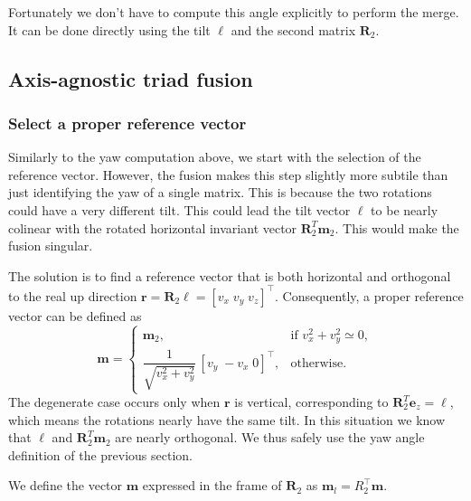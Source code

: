 \documentclass{IJCAS}
\begin{document}
 Fortunately we don't have to compute this angle explicitly to perform the merge. It can be done directly using the tilt $\boldsymbol{\ell}$ and the second matrix $\boldsymbol{R}_{2}$.

\subsection{Axis-agnostic triad fusion}
\label{sec:triad_fusion}

\subsubsection{Select a proper reference vector}
Similarly to the yaw computation above, we start with the selection of the reference vector. However, the fusion makes this step slightly more subtile than just identifying the yaw of a single matrix. This is because the two rotations could have a very different tilt. This could lead the tilt vector $\boldsymbol{\ell}$ to be nearly colinear with the rotated horizontal invariant vector $\boldsymbol{R}_{2}^T\boldsymbol{m}_2$. This would make the fusion singular. 

The solution is to find a reference vector that is both horizontal and orthogonal to the real up direction $\boldsymbol{r}=\boldsymbol{R}_{2}\boldsymbol{\ell}=[v_{x}\;v_{y}\;v_{z}]^{\top}$.
Consequently, a proper reference vector can be defined as
\[
  \boldsymbol{m}
  =
  \begin{cases}
    \boldsymbol{m}_2, &
      \text{if } v_{x}^{2}+v_{y}^{2}\simeq0,\\[6pt]
    \dfrac{1}{\sqrt{v_{x}^{2}+v_{y}^{2}}}\,[v_{y}\;-v_{x}\;0]^{\top},
    & \text{otherwise.}
  \end{cases}
\]
The degenerate case occurs only when $\boldsymbol{r}$ is vertical, corresponding to $\boldsymbol{R}_{2}^{T}\boldsymbol{e}_{z} = \boldsymbol{\ell}$, which means the rotations nearly have the same tilt. In this situation we know that $\boldsymbol{\ell}$ and $\boldsymbol{R}_{2}^T\boldsymbol{m}_2$ are nearly orthogonal. We thus safely use the yaw angle definition of the previous section.  

We define the vector $\boldsymbol{m}$ expressed in the frame of $\boldsymbol{R}_{2}$ as 
$\boldsymbol{m}_{l}=R_{2}^{\top}\boldsymbol{m}$.
\end{document}
